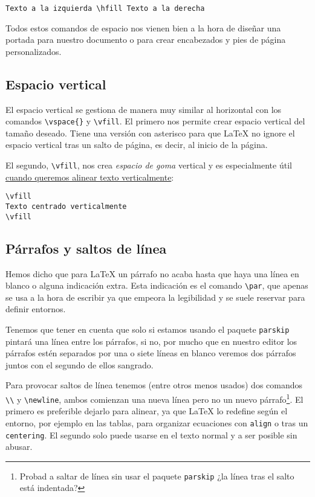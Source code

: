 \begin{lstlisting}
Texto a la izquierda \hfill Texto a la derecha
\end{lstlisting}

Todos estos comandos de espacio nos vienen bien a la hora de diseñar una
portada para nuestro documento o para crear encabezados y pies de página
personalizados.

\subsection{Espacio vertical}\label{espacio-vertical}

El espacio vertical se gestiona de manera muy similar al horizontal con
los comandos \lstinline!\vspace{}! y \lstinline!\vfill!. El primero nos
permite crear espacio vertical del tamaño deseado. Tiene una versión con
asterisco para que LaTeX no ignore el espacio vertical tras un salto de
página, es decir, al inicio de la página.

El segundo, \lstinline!\vfill!, nos crea \emph{espacio de goma} vertical
y es especialmente útil
\href{http://tex.stackexchange.com/questions/2326/vertically-center-text-on-a-page}{cuando
queremos alinear texto verticalmente}:

\begin{lstlisting}
\vfill
Texto centrado verticalmente
\vfill
\end{lstlisting}

\subsection{Párrafos y saltos de
línea}\label{puxe1rrafos-y-saltos-de-luxednea}

Hemos dicho que para LaTeX un párrafo no acaba hasta que haya una línea
en blanco o alguna indicación extra. Esta indicación es el comando
\lstinline!\par!, que apenas se usa a la hora de escribir ya que empeora
la legibilidad y se suele reservar para definir entornos.

Tenemos que tener en cuenta que solo si estamos usando el paquete
\lstinline!parskip! pintará una línea entre los párrafos, si no, por
mucho que en nuestro editor los párrafos estén separados por una o siete
líneas en blanco veremos dos párrafos juntos con el segundo de ellos
sangrado.

Para provocar saltos de línea tenemos (entre otros menos usados) dos
comandos \lstinline!\\! y \lstinline!\newline!, ambos comienzan una
nueva línea pero no un nuevo párrafo\footnote{Probad a saltar de línea
  sin usar el paquete \lstinline!parskip! ¿la línea tras el salto está
  indentada?}. El primero es preferible dejarlo para alinear, ya que
LaTeX lo redefine según el entorno, por ejemplo en las tablas, para
organizar ecuaciones con \lstinline!align! o tras un
\lstinline!centering!. El segundo solo puede usarse en el texto normal y
a ser posible sin abusar.

